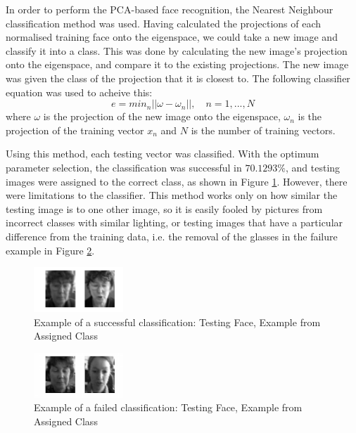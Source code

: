 \documentclass[10pt,twocolumn,letterpaper]{article}
\begin{document}
In order to perform the PCA-based face recognition, the Nearest Neighbour classification method was used. Having calculated the projections of each normalised training face onto the eigenspace, we could take a new image and classify it into a class. This was done by calculating the new image's projection onto the eigenspace, and compare it to the existing projections. The new image was given the class of the projection that it is closest to. The following classifier equation was used to acheive this:
\begin{equation}
e = min_n ||\omega - \omega_n||,\quad n = 1,...,N
\end{equation}
where $\omega$ is the projection of the new image onto the eigenspace, $\omega_n$ is the projection of the training vector $x_n$ and $N$ is the number of training vectors.

Using this method, each testing vector was classified. With the optimum parameter selection, the classification was successful in $70.1293\%$, and testing images were assigned to the correct class, as shown in Figure \ref{fig:Q2B_NN_success}. However, there were limitations to the classifier. This method works only on how similar the testing image is to one other image, so it is easily fooled by pictures from incorrect classes with similar lighting, or testing images that have a particular difference from the training data, i.e. the removal of the glasses in the failure example in Figure \ref{fig:Q2B_NN_failure}.

\begin{figure}[H]
\begin{center}
  
    \includegraphics[width=0.3\textwidth]{../results/Q2B_NN_success}

  \caption{Example of a successful classification: Testing Face, Example from Assigned Class \label{fig:Q2B_NN_success}}

\end{center}
\end{figure}

\begin{figure}[H]
\begin{center}
  
    \includegraphics[width=0.3\textwidth]{../results/Q2B_NN_failure}

  \caption{Example of a failed classification: Testing Face, Example from Assigned Class \label{fig:Q2B_NN_failure}}

\end{center}
\end{figure}
\end{document}
